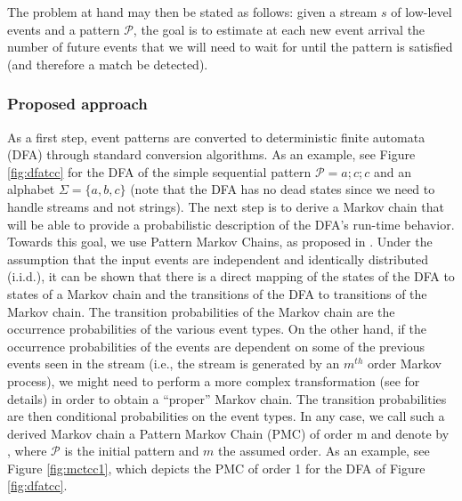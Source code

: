 The problem at hand may then be stated as follows: given a stream $s$ of low-level events and a pattern $\mathcal{P}$, 
the goal is to estimate at each new event arrival the number of future events
that we will need to wait for until the pattern is satisfied (and therefore a match be detected).

\subsubsection{Proposed approach}

As a first step, event patterns are converted to deterministic finite automata (DFA) through standard conversion algorithms.
As an example, see Figure \ref{fig:dfatcc} for the DFA of the simple sequential pattern $\mathcal{P}=a ; c ; c$ and an alphabet $\Sigma=\{a,b,c\}$
(note that the DFA has no dead states since we need to handle streams and not strings).
The next step is to derive a Markov chain that will be able to provide a probabilistic description of the DFA's run-time behavior.
Towards this goal, we use Pattern Markov Chains, as  proposed in \cite{nuel_pattern_2008}.
Under the assumption that the input events are independent and identically distributed (i.i.d.), it can be shown that there is a direct mapping of the states of the DFA to states of a Markov chain and the transitions of the DFA to transitions of the Markov chain.
The transition probabilities of the Markov chain are the occurrence probabilities of the various event types.
On the other hand, if the occurrence probabilities of the events are dependent on some of the previous events seen in the stream 
(i.e., the stream is generated by an $m^{th}$ order Markov process),
we might need to perform a more complex transformation 
(see \cite{nuel_pattern_2008} for details)
in order to obtain a ``proper'' Markov chain.
The transition probabilities are then conditional probabilities on the event types.
In any case,
we call such a derived Markov chain a Pattern Markov Chain (PMC) of order m
and denote by \pmcmr , where $\mathcal{P}$ is the initial pattern and $m$ the assumed order.
As an example, see Figure \ref{fig:mctcc1}, which depicts the PMC of order 1 for the DFA of Figure \ref{fig:dfatcc}.
